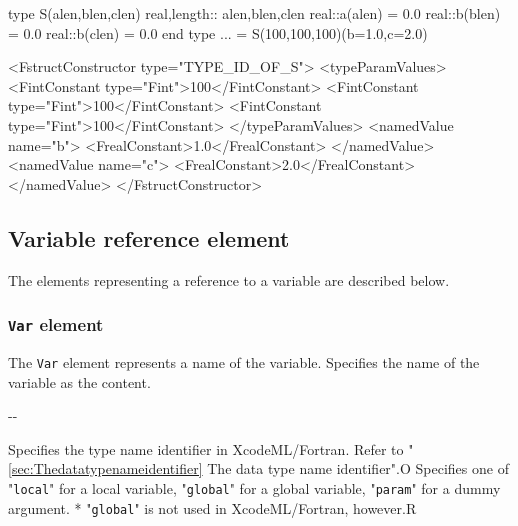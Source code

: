 \begin{Fexample2008}
type S(alen,blen,clen)
real,length:: alen,blen,clen
real::a(alen) = 0.0
real::b(blen) = 0.0
real::b(clen) = 0.0
end type
... = S(100,100,100)(b=1.0,c=2.0)
\end{Fexample2008}
\vspace{1mm}

\begin{XcodeMLFExample}
<FstructConstructor type="TYPE_ID_OF_S">
<typeParamValues>
  <FintConstant type="Fint">100</FintConstant>
<FintConstant type="Fint">100</FintConstant>
<FintConstant type="Fint">100</FintConstant>
  </typeParamValues>
  <namedValue name="b">
     <FrealConstant>1.0</FrealConstant>
  </namedValue>
  <namedValue name="c">
     <FrealConstant>2.0</FrealConstant>
  </namedValue>
</FstructConstructor>
\end{XcodeMLFExample}


\subsection{Variable reference element}

The elements representing a reference to a variable are described below.

\subsubsection{ {\tt Var} element}

The {\tt Var} element represents a name of the variable.
Specifies the name of the variable as the content.


\begin{XcodeMLChildElements}
\XcodeMLElementDef{-}
{-}{-}
\end{XcodeMLChildElements}

\begin{XcodeMLAttributes}
{Specifies the type name identifier in XcodeML/Fortran.
 Refer to "\ref{sec:Thedatatypenameidentifier} The data type name identifier".}{O}
{Specifies one of
\newline
"{\tt local}" for a local variable,
\newline
"{\tt global}" for a global variable,
\newline
"{\tt param}" for a dummy argument.
\newline
* "{\tt global}" is not used in XcodeML/Fortran, however.}{R}
\end{XcodeMLAttributes}


